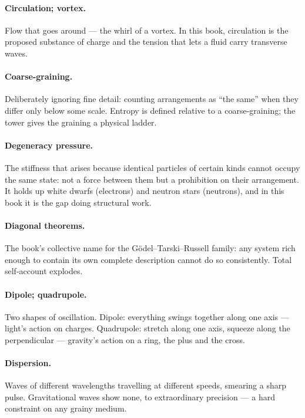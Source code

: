 \documentclass[fontsize=11pt,paper=a4,pagesize=auto,parskip=half-]{scrbook}
\begin{document}
\paragraph{Circulation; vortex.} Flow that goes around --- the whirl of a vortex. In this book, circulation is the proposed substance of charge and the tension that lets a fluid carry transverse waves.

\paragraph{Coarse-graining.} Deliberately ignoring fine detail: counting arrangements as ``the same'' when they differ only below some scale. Entropy is defined relative to a coarse-graining; the tower gives the graining a physical ladder.

\paragraph{Degeneracy pressure.} The stiffness that arises because identical particles of certain kinds cannot occupy the same state: not a force between them but a prohibition on their arrangement. It holds up white dwarfs (electrons) and neutron stars (neutrons), and in this book it is the gap doing structural work.

\paragraph{Diagonal theorems.} The book's collective name for the G\"odel--Tarski--Russell family: any system rich enough to contain its own complete description cannot do so consistently. Total self-account explodes.

\paragraph{Dipole; quadrupole.} Two shapes of oscillation. Dipole: everything swings together along one axis --- light's action on charges. Quadrupole: stretch along one axis, squeeze along the perpendicular --- gravity's action on a ring, the plus and the cross.

\paragraph{Dispersion.} Waves of different wavelengths travelling at different speeds, smearing a sharp pulse. Gravitational waves show none, to extraordinary precision --- a hard constraint on any grainy medium.
\end{document}
